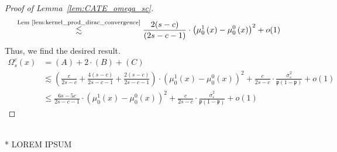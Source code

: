 \begin{proof}[Proof of Lemma~\ref{lem:CATE_omega_sc}]
\begin{equation}
\begin{aligned}
            & \overset{\text{Lem \ref{lem:kernel_prod_dirac_convergence}}}{\lesssim} 
            \frac{2(s-c)}{(2s-c-1)} \cdot \left(\mu_{0}^{1}\left(x\right) - \mu_{0}^{0}\left(x\right)\right)^2 + o(1)
		\end{aligned}
	\end{equation}
	Thus, we find the desired result.
	\begin{equation}
		\begin{aligned}
			\Omega_{s}^{c}\left(x\right)
			& = (A) + 2\cdot (B) + (C) \\
			& \lesssim 
            \left(\frac{c}{2s-c} + \frac{4(s-c)}{2s-c-1} + \frac{2(s-c)}{2s-c-1}\right) \cdot \left(\mu_{0}^{1}\left(x\right) - \mu_{0}^{0}\left(x\right)\right)^2
            + \frac{c}{2s-c} \cdot \frac{\overline{\sigma}^2_{\varepsilon}}{\mathfrak{p}\left(1 - \mathfrak{p}\right)}
            + o(1) \\
            & \leq \frac{6s-5c}{2s-c-1} \cdot \left(\mu_{0}^{1}\left(x\right) - \mu_{0}^{0}\left(x\right)\right)^2
            + \frac{c}{2s-c} \cdot \frac{\overline{\sigma}^2_{\varepsilon}}{\mathfrak{p}\left(1 - \mathfrak{p}\right)}
            + o(1) 
		\end{aligned}
	\end{equation}
\end{proof}

\newpage 

\begin{boxD}
    \begin{lem}\label{lem:CATE_zeta_s1_ub}\mbox{}\\*
        {\color{red} LOREM IPSUM}
    \end{lem}
\end{boxD}

